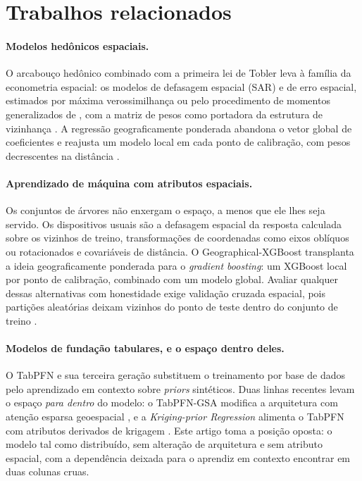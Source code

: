 \documentclass[11pt,a4paper]{article}
\begin{document}
\section{Trabalhos relacionados}
\label{sec:related}

\paragraph{Modelos hedônicos espaciais.} O arcabouço hedônico \citep{rosen1974} combinado com a
primeira lei de Tobler \citep{tobler1970} leva à família da econometria espacial: os modelos de
defasagem espacial (SAR) e de erro espacial, estimados por máxima verossimilhança ou pelo
procedimento de momentos generalizados de \citet{kelejian1998}, com a matriz de pesos como
portadora da estrutura de vizinhança \citep{anselin1988,lesage2009}. A regressão
geograficamente ponderada abandona o vetor global de coeficientes e reajusta um modelo local em
cada ponto de calibração, com pesos decrescentes na distância \citep{fotheringham2002}.

\paragraph{Aprendizado de máquina com atributos espaciais.} Os conjuntos de árvores não
enxergam o espaço, a menos que ele lhes seja servido. Os dispositivos usuais são a defasagem
espacial da resposta calculada sobre os vizinhos de treino, transformações de coordenadas como
eixos oblíquos ou rotacionados \citep{moller2020} e covariáveis de distância. O
Geographical-XGBoost \citep{grekousis2025} transplanta a ideia geograficamente ponderada para o
\emph{gradient boosting}: um XGBoost local por ponto de calibração, combinado com um modelo
global. Avaliar qualquer dessas alternativas com honestidade exige validação cruzada espacial,
pois partições aleatórias deixam vizinhos do ponto de teste dentro do conjunto de treino
\citep{roberts2017,meyer2022}.

\paragraph{Modelos de fundação tabulares, e o espaço dentro deles.} O TabPFN
\citep{hollmann2023tabpfn,hollmann2025nature} e sua terceira geração
\citep{priorlabs2026tabpfn3,priorlabs2026tabpfn35} substituem o treinamento por base de dados
pelo aprendizado em contexto sobre \emph{priors} sintéticos. Duas linhas recentes levam o
espaço \emph{para dentro} do modelo: o TabPFN-GSA modifica a arquitetura com atenção esparsa
geoespacial \citep{deng2026gsa}, e a \emph{Kriging-prior Regression} alimenta o TabPFN com
atributos derivados de krigagem \citep{schmidinger2026kpr}. Este artigo toma a posição oposta:
o modelo tal como distribuído, sem alteração de arquitetura e sem atributo espacial, com a
dependência deixada para o aprendiz em contexto encontrar em duas colunas cruas.
\end{document}
